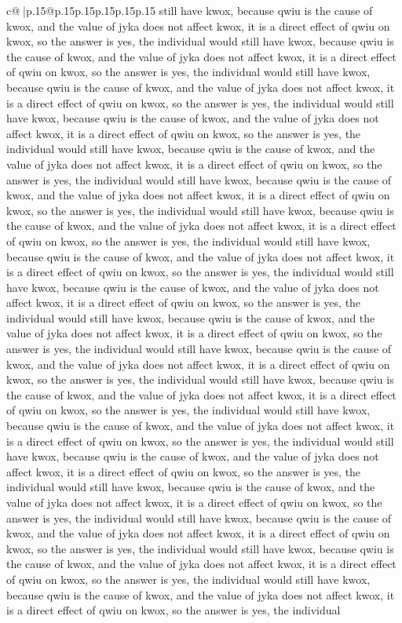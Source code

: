 \documentclass{article}
\begin{document}
{\begin{supertabular}{c@{$\;$}|p{.15\linewidth}@{}p{.15\linewidth}p{.15\linewidth}p{.15\linewidth}p{.15\linewidth}p{.15\linewidth}}
{{{still have kwox, because qwiu is the cause of kwox, and the value of jyka does not affect kwox, it is a direct effect of qwiu on kwox, so the answer is yes, the individual would still have kwox, because qwiu is the cause of kwox, and the value of jyka does not affect kwox, it is a direct effect of qwiu on kwox, so the answer is yes, the individual would still have kwox, because qwiu is the cause of kwox, and the value of jyka does not affect kwox, it is a direct effect of qwiu on kwox, so the answer is yes, the individual would still have kwox, because qwiu is the cause of kwox, and the value of jyka does not affect kwox, it is a direct effect of qwiu on kwox, so the answer is yes, the individual would still have kwox, because qwiu is the cause of kwox, and the value of jyka does not affect kwox, it is a direct effect of qwiu on kwox, so the answer is yes, the individual would still have kwox, because qwiu is the cause of kwox, and the value of jyka does not affect kwox, it is a direct effect of qwiu on kwox, so the answer is yes, the individual would still have kwox, because qwiu is the cause of kwox, and the value of jyka does not affect kwox, it is a direct effect of qwiu on kwox, so the answer is yes, the individual would still have kwox, because qwiu is the cause of kwox, and the value of jyka does not affect kwox, it is a direct effect of qwiu on kwox, so the answer is yes, the individual would still have kwox, because qwiu is the cause of kwox, and the value of jyka does not affect kwox, it is a direct effect of qwiu on kwox, so the answer is yes, the individual would still have kwox, because qwiu is the cause of kwox, and the value of jyka does not affect kwox, it is a direct effect of qwiu on kwox, so the answer is yes, the individual would still have kwox, because qwiu is the cause of kwox, and the value of jyka does not affect kwox, it is a direct effect of qwiu on kwox, so the answer is yes, the individual would still have kwox, because qwiu is the cause of kwox, and the value of jyka does not affect kwox, it is a direct effect of qwiu on kwox, so the answer is yes, the individual would still have kwox, because qwiu is the cause of kwox, and the value of jyka does not affect kwox, it is a direct effect of qwiu on kwox, so the answer is yes, the individual would still have kwox, because qwiu is the cause of kwox, and the value of jyka does not affect kwox, it is a direct effect of qwiu on kwox, so the answer is yes, the individual would still have kwox, because qwiu is the cause of kwox, and the value of jyka does not affect kwox, it is a direct effect of qwiu on kwox, so the answer is yes, the individual would still have kwox, because qwiu is the cause of kwox, and the value of jyka does not affect kwox, it is a direct effect of qwiu on kwox, so the answer is yes, the individual would still have kwox, because qwiu is the cause of kwox, and the value of jyka does not affect kwox, it is a direct effect of qwiu on kwox, so the answer is yes, the individual would still have kwox, because qwiu is the cause of kwox, and the value of jyka does not affect kwox, it is a direct effect of qwiu on kwox, so the answer is yes, the individual }}}
\end{supertabular}}
\end{document}
